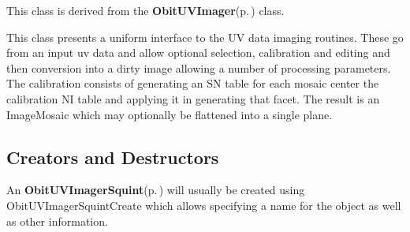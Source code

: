 This class is derived from the {\bf Obit\-UVImager}{\rm (p.\,\pageref{structObitUVImager})} class.

This class presents a uniform interface to the UV data imaging routines. These go from an input uv data and allow optional selection, calibration and editing and then conversion into a dirty image allowing a number of processing parameters. The calibration consists of generating an SN table for each mosaic center the calibration NI table and applying it in generating that facet. The result is an Image\-Mosaic which may optionally be flattened into a single plane.\subsection{Creators and Destructors}\label{ObitUVImagerSquint_8h_ObitUVImagerSquintaccess}
An {\bf Obit\-UVImager\-Squint}{\rm (p.\,\pageref{structObitUVImagerSquint})} will usually be created using Obit\-UVImager\-Squint\-Create which allows specifying a name for the object as well as other information.

